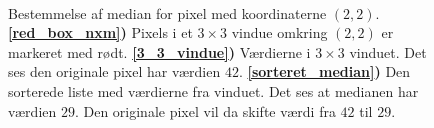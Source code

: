 {\begin{figure}[!h]
    \centering
    \\
    \hspace{1em}
        \caption[]{
            Bestemmelse af median for pixel med koordinaterne $(2, 2)$.
            \textbf{\ref{red_box_nxm})} Pixels i et $3\times3$ vindue
            omkring $(2, 2)$ er markeret med rødt.
            \textbf{\ref{3_3_vindue})} Værdierne i $3\times3$ vinduet.
            Det ses den originale pixel har værdien $42$.
            \textbf{\ref{sorteret_median})} Den sorterede liste med
            værdierne fra vinduet. Det ses at medianen har værdien
            $29$. Den originale pixel vil da skifte værdi fra $42$ til
            $29$.
        }
\end{figure}

}
